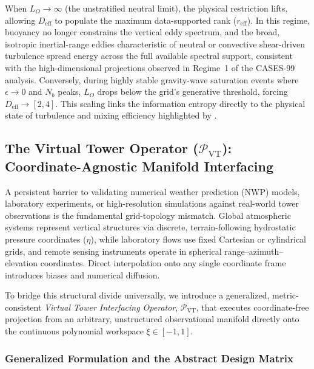 \documentclass[11pt,a4paper]{article}
\begin{document}
When $L_O \rightarrow \infty$ (the unstratified neutral limit), the physical restriction lifts, allowing $D_{\mathrm{eff}}$ to populate the maximum data-supported rank ($r_{\mathrm{eff}}$). In this regime, buoyancy no longer constrains the vertical eddy spectrum, and the broad, isotropic inertial-range eddies characteristic of neutral or convective shear-driven turbulence spread energy across the full available spectral support, consistent with the high-dimensional projections observed in Regime~1 of the CASES-99 analysis. Conversely, during highly stable gravity-wave saturation events where $\epsilon \rightarrow 0$ and $N_b$ peaks, $L_O$ drops below the grid's generative threshold, forcing $D_{\mathrm{eff}} \rightarrow [2, 4]$. This scaling links the information entropy directly to the physical state of turbulence and mixing efficiency highlighted by \citet{Garanaik2019}.

\subsection{The Virtual Tower Operator (\texorpdfstring{$\mathcal{P}_{\mathrm{VT}}$}{PVT}): Coordinate-Agnostic Manifold Interfacing}
\label{sec:extensions:virtual_tower}

A persistent barrier to validating numerical weather prediction (NWP) models, laboratory experiments, or high-resolution simulations against real-world tower observations is the fundamental grid-topology mismatch. Global atmospheric systems represent vertical structures via discrete, terrain-following hydrostatic pressure coordinates ($\eta$), while laboratory flows use fixed Cartesian or cylindrical grids, and remote sensing instruments operate in spherical range--azimuth--elevation coordinates. Direct interpolation onto any single coordinate frame introduces biases and numerical diffusion.

To bridge this structural divide universally, we introduce a generalized, metric-consistent \emph{Virtual Tower Interfacing Operator}, $\mathcal{P}_{\mathrm{VT}}$, that executes coordinate-free projection from an arbitrary, unstructured observational manifold directly onto the continuous polynomial workspace $\xi \in [-1, 1]$.

\subsubsection{Generalized Formulation and the Abstract Design Matrix}
\label{sec:extensions:p_vt_math}
\end{document}
